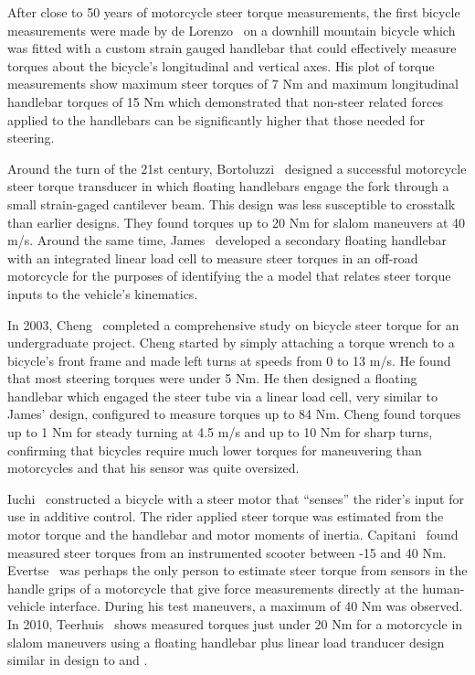\documentclass[10pt]{article}
\begin{document}
After close to 50 years of motorcycle steer torque measurements, the first
bicycle measurements were made by de Lorenzo~\cite{Lorenzo1997} on a downhill
mountain bicycle which was fitted with a custom strain gauged handlebar that
could effectively measure torques about the bicycle's longitudinal and vertical
axes. His plot of torque measurements show maximum steer torques of 7 Nm and
maximum longitudinal handlebar torques of 15 Nm which demonstrated that
non-steer related forces applied to the handlebars can be significantly higher
that those needed for steering.

Around the turn of the 21st century, Bortoluzzi~\cite{Bortoluzzi2000} designed
a successful motorcycle steer torque transducer in which floating handlebars
engage the fork through a small strain-gaged cantilever beam. This design was
less susceptible to crosstalk than earlier designs. They found torques up to 20
Nm for slalom maneuvers at 40 m/s. Around the same time, James~\cite{James2002}
developed a secondary floating handlebar with an integrated linear load cell to
measure steer torques in an off-road motorcycle for the purposes of identifying
the a model that relates steer torque inputs to the vehicle's kinematics.

In 2003, Cheng~\cite{Cheng2003} completed a comprehensive study on bicycle
steer torque for an undergraduate project. Cheng started by simply attaching a
torque wrench to a bicycle's front frame and made left turns at speeds from 0
to 13 m/s. He found that most steering torques were under 5 Nm. He then
designed a floating handlebar which engaged the steer tube via a linear load
cell, very similar to James' design, configured to measure torques up to 84 Nm.
Cheng found torques up to 1 Nm for steady turning at 4.5 m/s and up to 10 Nm
for sharp turns, confirming that bicycles require much lower torques for
maneuvering than motorcycles and that his sensor was quite oversized.

Iuchi~\cite{Iuchi2006} constructed a bicycle with a steer motor that ``senses''
the rider's input for use in additive control. The rider applied steer torque
was estimated from the motor torque and the handlebar and motor moments of
inertia. Capitani~\cite{Capitani2006} found measured steer torques from an
instrumented scooter between -15 and 40 Nm. Evertse~\cite{Evertse2010} was
perhaps the only person to estimate steer torque from sensors in the handle
grips of a motorcycle that give force measurements directly at the
human-vehicle interface. During his test maneuvers, a maximum of 40 Nm was
observed. In 2010, Teerhuis~\cite{Teerhuis2010} shows measured torques just
under 20 Nm for a motorcycle in slalom maneuvers using a floating handlebar
plus linear load tranducer design similar in design to \cite{James2002} and
\cite{Cheng2003}.
\end{document}
